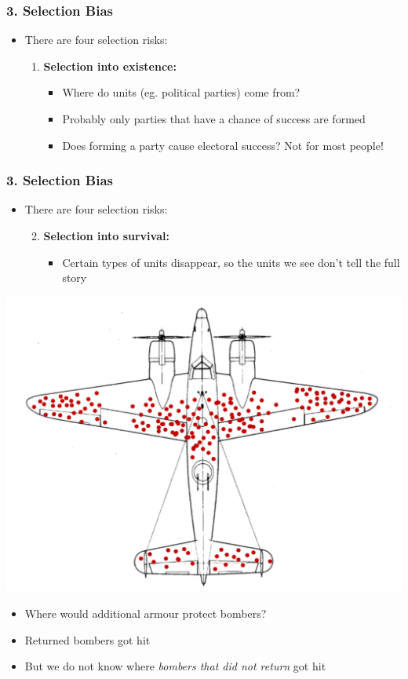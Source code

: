 \documentclass[xcolor=x11names,compress]{beamer}\usepackage[]{graphicx}\usepackage[]{color}
\renewcommand{\(}{\begin{columns}}
\renewcommand{\)}{\end{columns}}
\newcommand{\<}[1]{\begin{column}{#1}}
\renewcommand{\>}{\end{column}}
\begin{document}
\begin{frame}
\frametitle{3. Selection Bias}
\begin{itemize}
\item There are four selection risks:
\begin{enumerate}
\item \textbf{Selection into existence:}
\begin{itemize}
\item Where do units (eg. political parties) come from?
\item Probably only parties that have a chance of success are formed
\item Does forming a party cause electoral success? Not for most people!
\end{itemize}
\end{enumerate}
\end{itemize}
\end{frame}

\begin{frame}
\frametitle{3. Selection Bias}
\begin{itemize}
\item There are four selection risks:
\begin{enumerate}
\setcounter{enumi}{1}
\item \textbf{Selection into survival:}
\begin{itemize}
\item Certain types of units disappear, so the units we see don't tell the full story
\end{itemize}
\end{enumerate}
\end{itemize}
\begin{multicols}{2}
\includegraphics[scale=0.25]{Bombers.pdf}
\columnbreak
\begin{itemize}
\item Where would additional armour protect bombers?
\item Returned bombers got hit
\item But we do not know where \textit{bombers that did not return} got hit
\end{itemize}
\end{multicols}
\end{frame}
\end{document}
